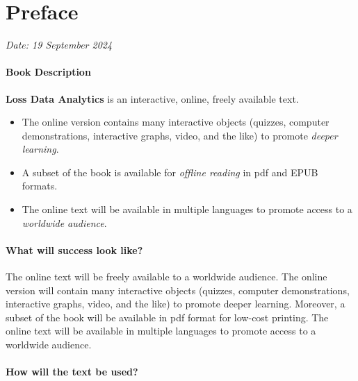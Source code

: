 \documentclass[
  12pt,
  krantz2]{Format/krantzNoCorner}
\author{}
\date{\vspace{-2.5em}}
\providecommand{\tightlist}{%
  \setlength{\itemsep}{0pt}\setlength{\parskip}{0pt}}
\begin{document}
  

{
\hypersetup{linkcolor=}
\setcounter{tocdepth}{2}
\tableofcontents
}
\hypertarget{preface}{%
\chapter*{Preface}\label{preface}}


\emph{Date: 19 September 2024}

\hypertarget{book-description}{%
\subsubsection*{Book Description}\label{book-description}}


\textbf{Loss Data Analytics} is an interactive, online, freely available text.

\begin{itemize}
\tightlist
\item
  The online version contains many interactive objects (quizzes, computer demonstrations, interactive graphs, video, and the like) to promote \emph{deeper learning}.
\item
  A subset of the book is available for \emph{offline reading} in pdf and EPUB formats.
\item
  The online text will be available in multiple languages to promote access to a \emph{worldwide audience}.
\end{itemize}

\hypertarget{what-will-success-look-like}{%
\subsubsection*{What will success look like?}\label{what-will-success-look-like}}


The online text will be freely available to a worldwide audience. The online version will contain many interactive objects (quizzes, computer demonstrations, interactive graphs, video, and the like) to promote deeper learning. Moreover, a subset of the book will be available in pdf format for low-cost printing. The online text will be available in multiple languages to promote access to a worldwide audience.

\hypertarget{how-will-the-text-be-used}{%
\subsubsection*{How will the text be used?}\label{how-will-the-text-be-used}}
\end{document}
